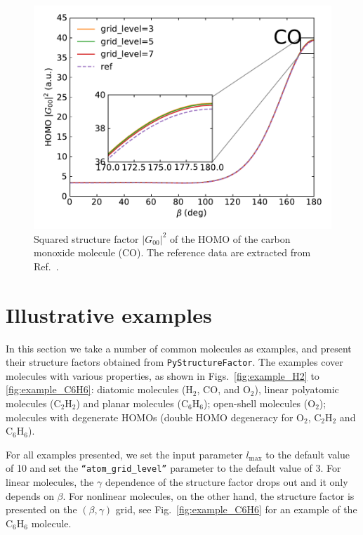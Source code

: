 \documentclass[preprint,12pt]{elsarticle} %
\renewcommand{\rm}[1]{\mathrm{#1}}    %
\newcommand{\abs}[1]{\lvert #1 \rvert}  %
\begin{document}
\begin{figure}[tb]
    \centering
    \includegraphics[width=\columnwidth]{CO_ConvTest_sub_20230226.pdf}
    \caption{Squared structure factor $\abs{G_{00}}^2$ of the HOMO of the carbon monoxide molecule ($\rm{CO}$). The reference data are extracted from Ref.~\cite{saito_structure_2015}.}
    \label{fig:convtest_CO}
\end{figure}


\section{Illustrative examples}
\label{sec:example}

In this section we take a number of common molecules as examples, and present their structure factors obtained from \texttt{PyStructureFactor}. The examples cover molecules with various properties, as shown in Figs.~\ref{fig:example_H2} to \ref{fig:example_C6H6}: diatomic molecules ($\rm{H}_2$, $\rm{CO}$, and $\rm{O}_2$), linear polyatomic molecules ($\rm{C}_2\rm{H}_2$) and planar molecules ($\rm{C}_6\rm{H}_6$); open-shell molecules ($\rm{O}_2$); molecules with degenerate HOMOs (double HOMO degeneracy for $\rm{O}_2$, $\rm{C}_2\rm{H}_2$ and $\rm{C}_6\rm{H}_6$).

For all examples presented, we set the input parameter $l_{\rm{max}}$ to the default value of 10 and set the \texttt{``atom\_grid\_level''} parameter to the default value of 3.
For linear molecules, the $\gamma$ dependence of the structure factor drops out and it only depends on $\beta$. For nonlinear molecules, on the other hand, the structure factor is presented on the $(\beta,\gamma)$ grid, see Fig.~\ref{fig:example_C6H6} for an example of the $\rm{C}_6\rm{H}_6$ molecule.
\end{document}
